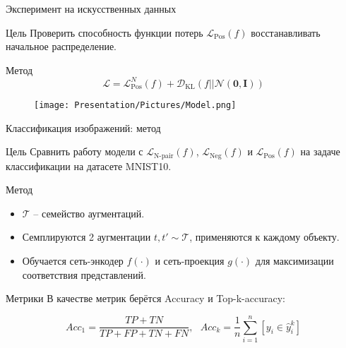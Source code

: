\documentclass{beamer}
\begin{document}
\begin{frame}{Эксперимент на искусственных данных}
\small
\begin{block}{Цель}
Проверить способность функции потерь $\mathcal{L}_{\text{Pos}}(f)$ восстанавливать начальное распределение.
\end{block}

\begin{block}{Метод}
\[\mathcal{L} = \mathcal{L}^N_{\text{Pos}}(f) + \mathcal{D}_{\text{KL}}(f||\mathcal{N}(\mathbf{0}, \mathbf{I}))\]
\end{block}

\begin{figure}
    \texttt{[image: Presentation/Pictures/Model.png]}
\end{figure}
\end{frame}
\begin{frame}{Классификация изображений: метод}
\small
\begin{block}{Цель}
Сравнить работу модели с $\mathcal{L}_{\text{N-pair}}(f)$, $\mathcal{L}_{\text{Neg}}(f)$ и $\mathcal{L}_{\text{Pos}}(f)$ на задаче классификации на датасете MNIST10.
\end{block}

\begin{block}{Метод}
\begin{itemize}
    \item $\mathcal{T}$ -- семейство аугментаций.
    \item Семплируются 2 аугментации $t, t' \sim \mathcal{T}$, применяются к каждому объекту.
    \item Обучается сеть-энкодер $f(\cdot)$ и сеть-проекция $g(\cdot)$ для максимизации соответствия представлений.
\end{itemize}
\end{block}

\begin{block}{Метрики}
В качестве метрик берётся Accuracy и Top-k-accuracy:

\[Acc_1 = \frac{TP + TN}{TP + FP + TN + FN}, ~~~ Acc_k = \frac{1}{n}\sum\limits_{i=1}^n[y_i \in \hat{y}_i^k]\]
\end{block}
\end{frame}
\end{document}
